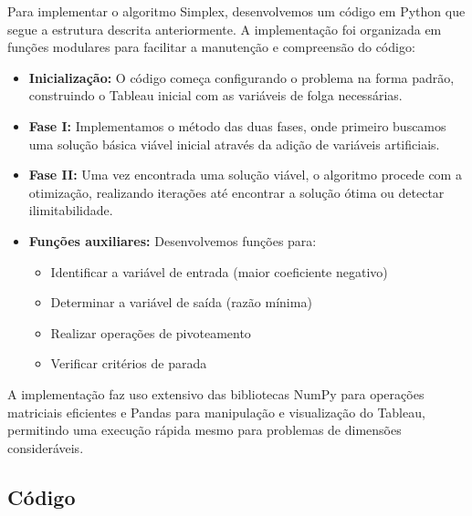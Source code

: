 \documentclass{article}
\begin{document}
Para implementar o algoritmo Simplex, desenvolvemos um código em Python que segue a estrutura descrita anteriormente. A implementação foi organizada em funções modulares para facilitar a manutenção e compreensão do código:

\begin{itemize}
    \item \textbf{Inicialização:} O código começa configurando o problema na forma padrão, construindo o Tableau inicial com as variáveis de folga necessárias.
    
    \item \textbf{Fase I:} Implementamos o método das duas fases, onde primeiro buscamos uma solução básica viável inicial através da adição de variáveis artificiais.
    
    \item \textbf{Fase II:} Uma vez encontrada uma solução viável, o algoritmo procede com a otimização, realizando iterações até encontrar a solução ótima ou detectar ilimitabilidade.
    
    \item \textbf{Funções auxiliares:} Desenvolvemos funções para:
    \begin{itemize}
        \item Identificar a variável de entrada (maior coeficiente negativo)
        \item Determinar a variável de saída (razão mínima)
        \item Realizar operações de pivoteamento
        \item Verificar critérios de parada
    \end{itemize}
\end{itemize}

A implementação faz uso extensivo das bibliotecas NumPy para operações matriciais eficientes e Pandas para manipulação e visualização do Tableau, permitindo uma execução rápida mesmo para problemas de dimensões consideráveis.

\subsection{Código}
\end{document}
